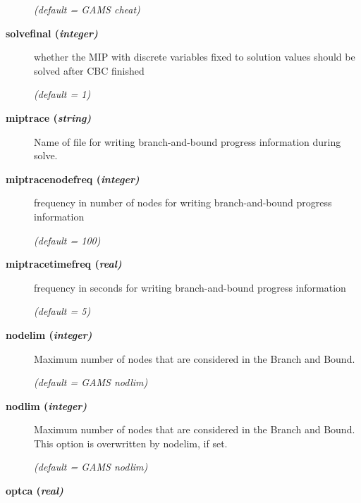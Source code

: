 \begin{description}
\textsl{(default = GAMS cheat)}

\item[\label{solvefinal}\hypertarget{solvefinal}
{\textbf{solvefinal (\slshape{integer})}}]\hspace{1.0in}

whether the MIP with discrete variables fixed to solution values should be solved after CBC finished

\textsl{(default = 1)}

\item[\label{miptrace}\hypertarget{miptrace}
{\textbf{miptrace (\slshape{string})}}]\hspace{1.0in}

Name of file for writing branch-and-bound progress information during solve.


\item[\label{miptracenodefreq}\hypertarget{miptracenodefreq}
{\textbf{miptracenodefreq (\slshape{integer})}}]\hspace{1.0in}

frequency in number of nodes for writing branch-and-bound progress information

\textsl{(default = 100)}

\item[\label{miptracetimefreq}\hypertarget{miptracetimefreq}
{\textbf{miptracetimefreq (\slshape{real})}}]\hspace{1.0in}

frequency in seconds for writing branch-and-bound progress information

\textsl{(default = 5)}

\item[\label{nodelim}\hypertarget{nodelim}
{\textbf{nodelim (\slshape{integer})}}]\hspace{1.0in}

Maximum number of nodes that are considered in the Branch and Bound.

\textsl{(default = GAMS nodlim)}

\item[\label{nodlim}\hypertarget{nodlim}
{\textbf{nodlim (\slshape{integer})}}]\hspace{1.0in}

Maximum number of nodes that are considered in the Branch and Bound.
This option is overwritten by nodelim, if set.

\textsl{(default = GAMS nodlim)}

\item[\label{optca}\hypertarget{optca}
{\textbf{optca (\slshape{real})}}]\hspace{1.0in}


\end{description}
